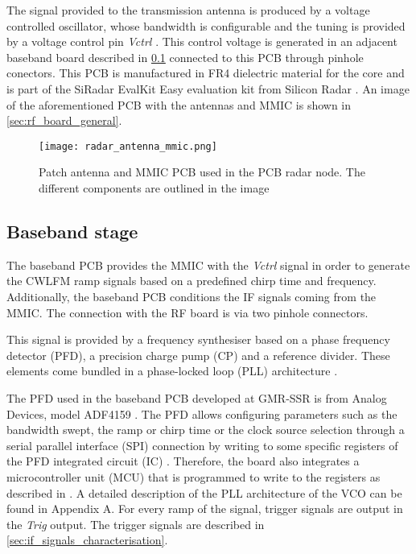 The signal provided to the transmission antenna is produced by a voltage controlled oscillator, whose bandwidth is configurable and the tuning is provided by a voltage control pin \textit{Vctrl} \cite{SR2021}. This control voltage is generated in an adjacent baseband board described in \cref{sec:baseband_general} connected to this PCB through pinhole conectors. This PCB is manufactured in FR4 dielectric material for the core and is part of the SiRadar EvalKit Easy evaluation kit from Silicon Radar \cite{SR2021eval}. An image of the aforementioned PCB with the antennas and MMIC is shown in  \cref{sec:rf_board_general}.

\begin{figure}[ht]
	\centering
	\texttt{[image: radar\_antenna\_mmic.png]}
	\caption{Patch antenna and MMIC PCB used in the PCB radar node. The different components are outlined in the image \label{fig:rf_board_general}}
\end{figure}

\subsection{Baseband stage} \label{sec:baseband_general}

The baseband PCB provides the MMIC with the \textit{Vctrl} signal in order to generate the CWLFM ramp signals based on a predefined chirp time and frequency. Additionally, the baseband PCB conditions the IF signals coming from the MMIC. The connection with the RF board is via two pinhole connectors.

This signal is provided by a frequency synthesiser based on a phase frequency detector (PFD), a precision charge pump (CP) and a reference divider. These elements come bundled in a phase-locked loop (PLL) architecture \cite{Sardinero2022}.

The PFD used in the baseband PCB developed at GMR-SSR is from Analog Devices, model ADF4159 \cite{TexasInstrumentsADF}. The PFD allows configuring parameters such as the bandwidth swept, the ramp or chirp time or the clock source selection through a serial parallel interface (SPI) connection by writing to some specific registers of the PFD integrated circuit (IC) \cite{Sardinero2022, ZZZ}. Therefore, the board also integrates a microcontroller unit (MCU) that is programmed to write to the registers as described in \cite{Sardinero2022}. A detailed description of the PLL architecture of the VCO can be found in Appendix A. %
For every ramp of the signal, trigger signals are output in the \textit{Trig} output. The trigger signals are described in \cref{sec:if_signals_characterisation}.

